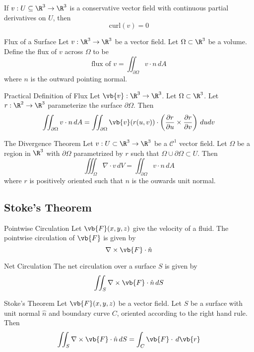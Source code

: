 \documentclass[a4paper]{article}
\begin{document}
\begin{prp}{}{} If $v:U\subseteq\R^3\to\R^3$ is a conservative vector field with continuous partial derivatives on $U$, then $$\text{curl}(v)=0$$
\end{prp}

\begin{defn}{Flux of a Surface}{} Let $v:\R^3\to\R^3$ be a vector field. Let $\Omega\subset\R^3$ be a volume. Define the flux of $v$ across $\Omega$ to be $$\text{flux of }v=\iint_{\partial\Omega}v\cdot n\,dA$$ where $n$ is the outward pointing normal. 
\end{defn}

\begin{lmm}{Practical Definition of Flux}{} Let $\vb{v}:\R^3\to\R^3$. Let $\Omega\subset\R^3$. Let $r:\R^2\to\R^3$ parameterize the surface $\partial\Omega$. Then $$\iint_{\partial\Omega}v\cdot n\,dA=\iint_{\partial\Omega}\vb{v}(r(u,v))\cdot\left(\frac{\partial r}{\partial u}\times\frac{\partial r}{\partial v}\right)\,dudv$$
\end{lmm}

\begin{thm}{The Divergence Theorem}{} Let $v:U\subset\R^3\to\R^3$ be a $\mathcal{C}^1$ vector field. Let $\Omega$ be a region in $\R^3$ with $\partial\Omega$ parametrized by $r$ such that $\Omega\cup\partial\Omega\subset U$. Then $$\iiint_\Omega\nabla\cdot v\,dV=\iint_{\partial\Omega} v\cdot n\,dA$$ where $r$ is positively oriented such that $n$ is the ouwards unit normal. 
\end{thm}

\subsection{Stoke's Theorem}
\begin{defn}{Pointwise Circulation}{} Let $\vb{F}(x,y,z)$ give the velocity of a fluid. The pointwise circulation of $\vb{F}$ is given by $$\nabla\times\vb{F}\cdot\hat{n}$$
\end{defn}

\begin{thm}{Net Circulation}{} The net circulation over a surface $S$ is given by $$\iint_S\nabla\times\vb{F}\cdot\hat{n}\,dS$$
\end{thm}

\begin{thm}{Stoke's Theorem}{} Let $\vb{F}(x,y,z)$ be a vector field. Let $S$ be a surface with unit normal $\hat{n}$ and boundary curve $C$, oriented according to the right hand rule. Then $$\iint_S\nabla\times\vb{F}\cdot\hat{n}\,dS=\int_C\vb{F}\cdot\,d\vb{r}$$
\end{thm}
\end{document}
